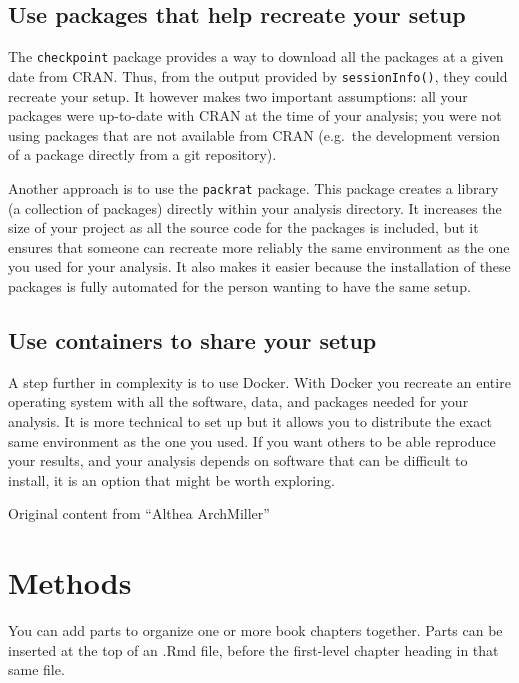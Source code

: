 \documentclass[
]{book}
\theoremstyle{definition}
\theoremstyle{definition}
\theoremstyle{definition}
\theoremstyle{definition}
\theoremstyle{remark}
\begin{document}
\hypertarget{use-packages-that-help-recreate-your-setup}{%
\section{Use packages that help recreate your setup}\label{use-packages-that-help-recreate-your-setup}}

The \texttt{checkpoint} package provides a way to download all the packages at a given date from CRAN. Thus, from the output provided by \texttt{sessionInfo()}, they could recreate your setup. It however makes two important assumptions: all your packages were up-to-date with CRAN at the time of your analysis; you were not using packages that are not available from CRAN (e.g.~the development version of a package directly from a git repository).

Another approach is to use the \texttt{packrat} package. This package creates a library (a collection of packages) directly within your analysis directory. It increases the size of your project as all the source code for the packages is included, but it ensures that someone can recreate more reliably the same environment as the one you used for your analysis. It also makes it easier because the installation of these packages is fully automated for the person wanting to have the same setup.

\hypertarget{use-containers-to-share-your-setup}{%
\section{Use containers to share your setup}\label{use-containers-to-share-your-setup}}

A step further in complexity is to use Docker. With Docker you recreate an entire operating system with all the software, data, and packages needed for your analysis. It is more technical to set up but it allows you to distribute the exact same environment as the one you used. If you want others to be able reproduce your results, and your analysis depends on software that can be difficult to install, it is an option that might be worth exploring.

Original content from ``Althea ArchMiller''

\hypertarget{methods}{%
\chapter{Methods}\label{methods}}

You can add parts to organize one or more book chapters together. Parts can be inserted at the top of an .Rmd file, before the first-level chapter heading in that same file.
\end{document}
